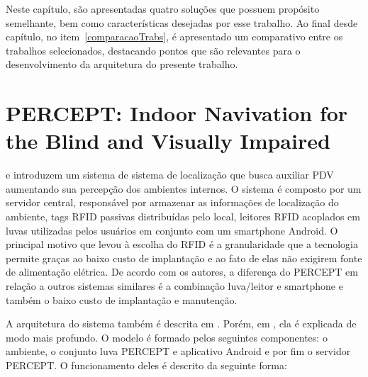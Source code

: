 \documentclass[english,brazilian]{UNISINOSmonografia}
\begin{document}
Neste capítulo, são apresentadas quatro soluções que possuem propósito semelhante, bem como características desejadas por esse trabalho. Ao final desde capítulo, no item~\ref{comparacaoTrabs}, é apresentado um comparativo entre os trabalhos selecionados, destacando pontos que são relevantes para o desenvolvimento da arquitetura do presente trabalho.

	\section{PERCEPT: Indoor Navivation for the Blind and Visually Impaired} 
 e  introduzem um sistema de sistema de localização que busca auxiliar PDV aumentando sua percepção dos ambientes internos. O sistema é composto por um servidor central, responsável por armazenar as informações de localização do ambiente, tags RFID passivas distribuídas pelo local, leitores RFID acoplados em luvas utilizadas pelos usuários em conjunto com um smartphone Android. O principal motivo que levou à escolha do RFID é a granularidade que a tecnologia permite graças ao baixo custo de implantação e ao fato de elas não exigirem fonte de alimentação elétrica. De acordo com os autores, a diferença do PERCEPT em relação a outros sistemas similares é a combinação luva/leitor e smartphone e também o baixo custo de implantação e manutenção. 

A arquitetura do sistema também é descrita em . Porém, em , ela é explicada de modo mais profundo. O modelo é formado pelos seguintes componentes: o ambiente, o conjunto luva PERCEPT e aplicativo Android e por fim o servidor PERCEPT. O funcionamento deles é descrito da seguinte forma:
\end{document}
